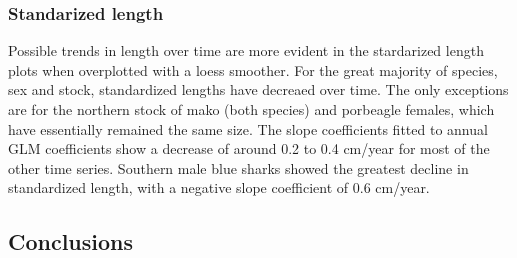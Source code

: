 \documentclass[12pt]{SCreport}
\begin{document}
\subsubsection{Standarized length}
Possible trends in length over time are more evident in the stardarized length plots when overplotted with a loess smoother.  For the great majority of species, sex and stock, standardized lengths have decreaed over time.  The only exceptions are for the northern stock of mako (both species) and porbeagle females, which have essentially remained the same size.  The slope coefficients fitted to annual GLM coefficients show a decrease of around 0.2 to 0.4 cm/year for most of the other time series.  Southern male blue sharks showed the greatest decline in standardized length, with a negative slope coefficient of 0.6 cm/year.

      

            
\subsection{Conclusions}
\end{document}
